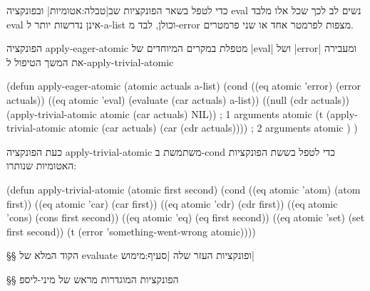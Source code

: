 כדי לטפל בשאר הפונקציות שב|טבלה:אטומיות| ובפונקציה eval נשים לב לכך שכל אלו
מלבד eval אינן נדרשות יותר ל-a-list וכולן, לבד מ-error מצפות לפרמטר אחד או שני
פרמטרים.

הפונקציה apply-eager-atomic מטפלת במקרים המיוחדים של \E|eval| ושל \E|error|
ומעבירה את המשך הטיפול ל-apply-trivial-atomic
\begin{KERNEL}
(defun apply-eager-atomic (atomic actuals a-list)
  (cond
    ((eq atomic 'error) (error actuals))
    ((eq atomic 'eval) (evaluate (car actuals) a-list))
    ((null (cdr actuals)) (apply-trivial-atomic atomic (car actuals) NIL)) ; 1 arguments atomic
    (t (apply-trivial-atomic atomic (car actuals) (car (cdr actuals))))    ; 2 arguments atomic
  )
)
\end{KERNEL}

כעת הפונקציה apply-trivial-atomic משתמשת ב-cond כדי לטפל בששת הפונקציות האטומיות שנותרו:
\begin{KERNEL}
(defun apply-trivial-atomic (atomic first second)
  (cond ((eq atomic 'atom) (atom first))
        ((eq atomic 'car) (car first))
        ((eq atomic 'cdr) (cdr first))
        ((eq atomic 'cons) (cons first second))
        ((eq atomic 'eq) (eq first second))
        ((eq atomic 'set) (set first second))
        (t (error 'something-went-wrong atomic))))
\end{KERNEL}

§§ הקוד המלא של evaluate ופונקציות העזר שלה
|סעיף:מימוש|

\immediate \closeout {}
\begin{LTR}
  
\end{LTR}

§§ הפונקציות המוגדרות מראש של מיני-ליספ

